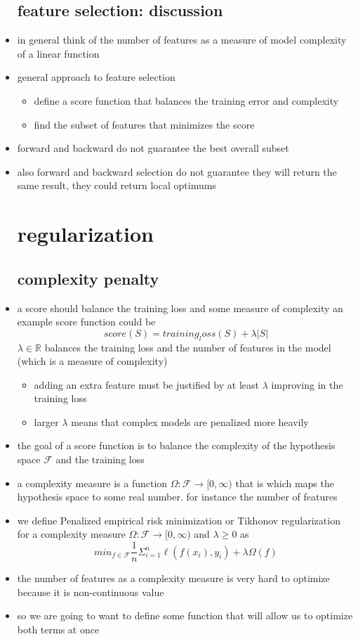 \documentclass{article}
\begin{document}
\begin{itemize}
\subsection{feature selection: discussion}
\item in general think of the number of features as a measure of model complexity of a linear function 
\item general approach to feature selection 
\begin{itemize}
    \item define a score function that balances the training error and complexity
    \item find the subset of features that minimizes the score
\end{itemize}
\item forward and backward do not guarantee the best overall subset 
\item also forward and backward selection do not guarantee they will return the same result, they could return local optimums

\section{regularization}
\subsection{complexity penalty}
\item a score should balance the training loss and some measure of complexity an example score function could be $$score(S)=training_loss(S)+\lambda|S|$$ $\lambda \in \mathbb{R}$ balances the training loss and the number of features in the model (which is a measure of complexity)
\begin{itemize}
    \item adding an extra feature must be justified by at least $\lambda$ improving in the training loss
    \item larger $\lambda$ means that complex models are penalized more heavily
\end{itemize}
\item the goal of a score function is to balance the complexity of the hypothesis space $\mathcal{F}$ and the training loss
\item a complexity measure is a function $\Omega: \mathcal{F}\rightarrow [0, \infty)$ that is which maps the hypothesis space to some real number. for instance the number of features
\item we define Penalized empirical risk minimization or Tikhonov regularization for a complexity measure $\Omega: \mathcal{F}\rightarrow [0, \infty)$ and $\lambda \geq 0$ as $$min_{f\in \mathcal{F}}\frac{1}{n}\Sigma_{i=1}^{n}\ell(f(x_i),y_i)+\lambda \Omega(f)$$
\item the number of features as a complexity measure is very hard to optimize because it is non-continuous value 
\item so we are going to want to define some function that will allow us to optimize both terms at once 

\end{itemize}
\end{document}
